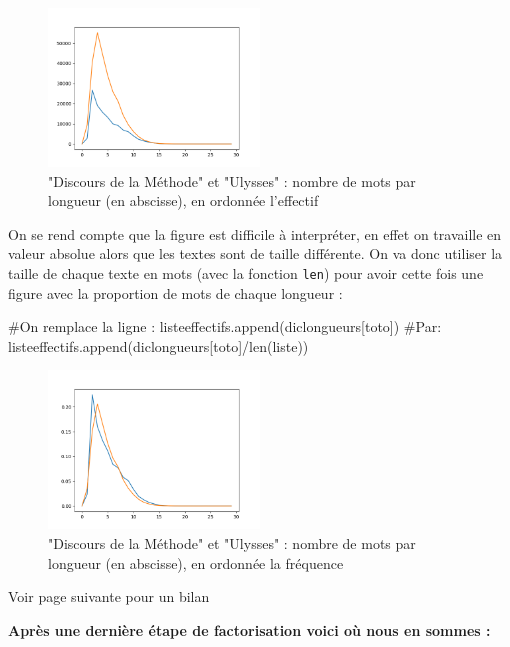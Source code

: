 \begin{figure}
\centering{}\includegraphics[width=0.5\textwidth]{images/TD1_effectifs_total.png}
\caption{"Discours de la Méthode" et "Ulysses" : nombre de mots par longueur
(en abscisse), en ordonnée l'effectif}
\end{figure}

On se rend compte que la figure est difficile à interpréter, en effet
on travaille en valeur absolue alors que les textes sont de taille
différente. On va donc utiliser la taille de chaque texte en mots
(avec la fonction \texttt{len}) pour avoir cette fois une figure avec
la proportion de mots de chaque longueur :

\newpage{}

\begin{python} \#On remplace la ligne : listeeffectifs.append(diclongueurs{[}toto{]})
\#Par: listeeffectifs.append(diclongueurs{[}toto{]}/len(liste)) \end{python}

\begin{figure}
\centering{}\includegraphics[width=0.5\textwidth]{images/TD1_frequences_total.png}
\caption{"Discours de la Méthode" et "Ulysses" : nombre de mots par longueur
(en abscisse), en ordonnée la fréquence}
\end{figure}

Voir page suivante pour un bilan

\newpage\textbf{Après une dernière étape de factorisation voici où
nous en sommes :}

